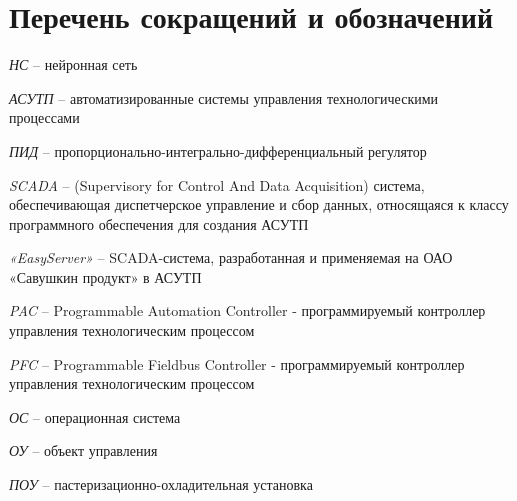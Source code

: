 \chapter*{Перечень сокращений и обозначений}

\textit{НС} -- нейронная сеть

\textit{АСУТП} -- автоматизированные системы управления технологическими процессами

\textit{ПИД} -- пропорционально-интегрально-дифференциальный регулятор

\textit{SCADA} -- (Supervisory for Control And Data Acquisition) система, обеспечивающая диспетчерское управление и сбор данных, относящаяся к классу программного обеспечения для создания АСУТП

\textit{«EasyServer»} -- SCADA-система, разработанная и применяемая на ОАО «Савушкин продукт» в АСУТП

\textit{PAC} -- Programmable Automation Controller - программируемый контроллер управления технологическим процессом

\textit{PFC} -- Programmable Fieldbus Controller - программируемый контроллер управления технологическим процессом

\textit{ОС} -- операционная система

\textit{ОУ} -- объект управления

\textit{ПОУ} -- пастеризационно-охладительная установка
